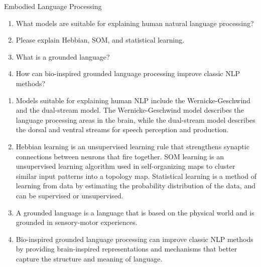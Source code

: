 \documentclass{article}
\begin{document}
\begin{exercise}{Embodied Language Processing}
  \begin{enumerate}
    \item What models are suitable for explaining human natural language processing?
    \item Please explain Hebbian, SOM, and statistical learning.
    \item What is a grounded language?
    \item How can bio-inspired grounded language processing improve classic NLP methods?
  \end{enumerate}

  \begin{solution}
    \begin{enumerate}
      \item Models suitable for explaining human NLP include the Wernicke-Geschwind and the dual-stream model. The Wernicke-Geschwind model describes the language processing areas in the brain, while the dual-stream model describes the dorsal and ventral streams for speech perception and production.
      \item Hebbian learning is an unsupervised learning rule that strengthens synaptic connections between neurons that fire together. SOM learning is an unsupervised learning algorithm used in self-organizing maps to cluster similar input patterns into a topology map. Statistical learning is a method of learning from data by estimating the probability distribution of the data, and can be supervised or unsupervised.
      \item A grounded language is a language that is based on the physical world and is grounded in sensory-motor experiences.
      \item Bio-inspired grounded language processing can improve classic NLP methods by providing brain-inspired representations and mechanisms that better capture the structure and meaning of language.
    \end{enumerate}
  \end{solution}
\end{exercise}
\end{document}
